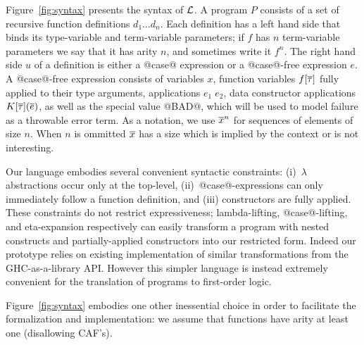 Figure~\ref{fig:syntax} presents the syntax of $\cal L$.  A program
$P$ consists of a set of recursive function definitions $d_1 \ldots
d_n$. Each definition has a left hand side that binds its type-variable and
term-variable parameters;
if $f$ has $n$ term-variable parameters we say that 
it has arity $n$, and sometimes write it $f^n$.
The right hand side $u$ of a definition is either a @case@ expression or a
@case@-free expression $e$.  A @case@-free expression consists of
variables $x$, function variables $f[\overline{\tau}]$ fully applied to their
type arguments, applications $e_1\;e_2$, data constructor applications
$K[\overline{\tau}](\overline{e})$, as well as the special value @BAD@, which will be
used to model failure as a throwable error term. As a notation, we use
$\overline{x}^{n}$ for sequences of elements of size $n$. When $n$ is
ommitted $\overline{x}$ has a size which is implied by the context or is not
interesting.

Our language embodies several convenient syntactic constraints: (i)~$\lambda$
abstractions occur only at the top-level, (ii)~@case@-expressions can
only immediately follow a function definition, and (iii) constructors
are fully applied.  These constraints do not restrict expressiveness;
lambda-lifting, @case@-lifting, and eta-expansion respectively can
easily transform a program with nested constructs and
partially-applied constructors into our restricted form.  Indeed our
prototype relies on existing implementation of similar transformations
from the GHC-as-a-library API. However this simpler language is
instead extremely convenient for the translation of programs to
first-order logic.

Figure~\ref{fig:syntax} embodies one other inessential choice in order to 
facilitate the formalization and implementation: we assume that 
functions have arity at least one (disallowing CAF's).   

